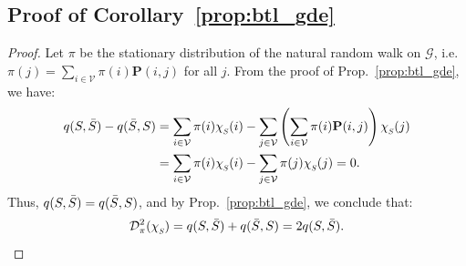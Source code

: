 \documentclass[10pt]{article} %
\def\rmP{{\mathbf{P}}}
\def\gV{{\mathcal{V}}}
\newcommand{\q}{q}
\newcommand{\D}[2]{\mathcal{D}^2_{#1}(#2)}
\newcommand{\chivec}[1] {{\chi_{\raisebox{-0.15em}{\scalebox{0.6}{$#1$}}}}}
\begin{document}
\subsection{Proof of Corollary~\ref{prop:btl_gde}}\label{proof:btl_gde}
\begin{proof}
  Let $\pi$ be the stationary distribution of the natural random walk on $\mathcal{G}$, i.e. $\pi(j) = \sum_{i \in \gV} \pi(i) \rmP(i,j)$ for all $j$. From the proof of Prop.~\ref{prop:btl_gde}, we have:
  \begin{align*}
    \q(S, \Bar{S}) - \q(\Bar{S}, S)
    &= \sum_{i \in \gV} \pi(i) \chivec{S}(i) - \sum_{j \in \gV} \left( \sum_{i \in \gV} \pi(i) \rmP(i,j) \right) \chivec{S}(j) \\
    &= \sum_{i \in \gV} \pi(i) \chivec{S}(i) - \sum_{j \in \gV} \pi(j) \chivec{S}(j) = 0.
  \end{align*}
  Thus, $\q(S, \Bar{S}) = \q(\Bar{S}, S)$, and by Prop.~\ref{prop:btl_gde}, we conclude that:
  \[
    \D{\pi}{\chivec{S}} = \q(S, \Bar{S}) + \q(\Bar{S}, S) = 2\q(S, \Bar{S}).
  \]
\end{proof}

%
\end{document}
